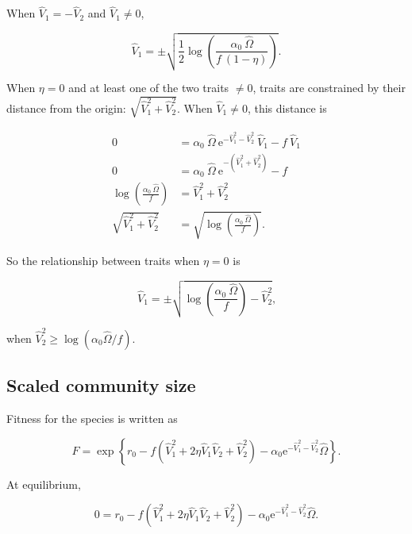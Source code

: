 \noindent When $\hat{V}_{1} = - \hat{V}_{2}$ and $\hat{V}_{1} \ne 0$,

$$
    \hat{V}_{1} = \pm \sqrt{\frac{1}{2}
        \log \left( \frac{ \alpha_0 ~ \hat{\Omega} }{ f ~ ( 1 - \eta ) } \right) }
    \textrm{.}
$$


When $\eta = 0$ and at least one of the two traits $\ne 0$,
traits are constrained by their distance
from the origin: $\sqrt{\hat{V}_{1}^2 + \hat{V}_{2}^2}$.
When $\hat{V}_{1} \ne 0$, this distance is

\begin{equation*}
\begin{split}
    0 &= \alpha_0 ~ \hat{\Omega} ~
            \textrm{e}^{-\hat{V}_{1}^2 - \hat{V}_{2}^2} ~ \hat{V}_{1}
        - f ~ \hat{V}_{1} \\
    0 &= \alpha_0 ~ \hat{\Omega} ~
        \textrm{e}^{- ( \hat{V}_{1}^2 + \hat{V}_{2}^2) }
        - f \\
    \log \left( \frac{\alpha_0 ~ \hat{\Omega}}{ f } \right) &=
        \hat{V}_{1}^2 + \hat{V}_{2}^2 \\
     \sqrt{ \hat{V}_{1}^2 + \hat{V}_{2}^2 } &=
        \sqrt{ \log \left( \frac{\alpha_0 ~ \hat{\Omega}}{ f } \right)}
    \textrm{.}
\end{split}
\end{equation*}

\noindent So the relationship between traits when $\eta = 0$ is

$$
    \hat{V}_{1} =
    \pm \sqrt{
        \log \left( \frac{\alpha_0 ~ \hat{\Omega}}{ f } \right) -
        \hat{V}_{2}^2
    }
    \textrm{,}
$$

\noindent when $\hat{V}_{2}^2 \ge \log (\alpha_0 \hat{\Omega} / f)$.


\subsection*{Scaled community size}

Fitness for the species is written as

$$
    F = \exp \left\{
        r_0 - f ( \hat{V}_{1}^2 + 2 \eta \hat{V}_{1} \hat{V}_{2} + \hat{V}_{2}^2 ) -
        \alpha_0 \textrm{e}^{ - \hat{V}_{1}^2 - \hat{V}_{2}^2 } \hat{\Omega}
    \right\}
    \textrm{.}
$$


\noindent At equilibrium,

$$
    0 = r_0 - f ( \hat{V}_{1}^2 + 2 \eta \hat{V}_{1} \hat{V}_{2} + \hat{V}_{2}^2 ) -
        \alpha_0 \textrm{e}^{ - \hat{V}_{1}^2 - \hat{V}_{2}^2 } \hat{\Omega}
    \textrm{.}
$$


